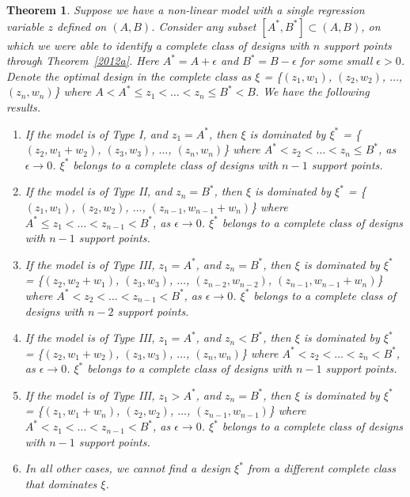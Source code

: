 \documentclass[11pt]{amsart}
\newtheorem{theorem}{Theorem}[section]
\theoremstyle{definition}
\theoremstyle{remark}
\numberwithin{equation}{section}
\begin{document}
\begin{theorem}\label{removepts}
 Suppose we have a non-linear model with a single regression variable $z$ defined on $(A,B)$. Consider any subset $[A^*,B^*]\subset (A,B)$, on which we were able to identify a complete class of designs with $n$ support points through Theorem~\ref{2012a}. Here $A^* = A+\epsilon$ and  $B^* = B-\epsilon$ for some small $\epsilon>0$. Denote the optimal design in the complete class as $\xi$ = \{$(z_1,w_1)$, $(z_2,w_2)$, $\ldots$, $(z_n,w_n)$\} where $A<A^*\le z_1< \ldots< z_n \le B^*<B$. We have the following results.\begin{enumerate}
     
     \item If the model is of Type I, and $z_1=A^*$, then $\xi$ is dominated by $\xi^*$ = \{$(z_2,w_1+w_2)$, $(z_3,w_3)$, $\ldots$, $(z_n,w_n)$\} where $A^* < z_2 <\ldots< z_n\le B^*$, as $\epsilon\to 0$.  $\xi^*$ belongs to a complete class of designs with $n-1$ support points.
     \item If the model is of Type II, and $z_n=B^*$, then $\xi$ is dominated by $\xi^*$ = \{$(z_1,w_1)$, $(z_2,w_2)$, $\ldots$, $(z_{n-1},w_{n-1}+w_n)$\} where $A^*\le z_1 <\ldots< z_{n-1}< B^*$, as $\epsilon\to 0$.  $\xi^*$ belongs to a complete class of designs with $n-1$ support points.
     \item If the model is of Type III, $z_1 = A^*$, and $z_n=B^*$, then $\xi$ is dominated by $\xi^*$ = \{$(z_2,w_2+w_1)$, $(z_3,w_3)$, $\ldots$, $(z_{n-2},w_{n-2})$,  $(z_{n-1},w_{n-1}+w_n)$\} where $A^*< z_2 <\ldots< z_{n-1}< B^*$, as $\epsilon\to 0$.  $\xi^*$ belongs to a complete class of designs with $n-2$ support points.
     \item If the model is of Type III, $z_1 = A^*$, and $z_n<B^*$, then $\xi$ is dominated by $\xi^*$ = \{$(z_2,w_1+w_2)$, $(z_3,w_3)$, $\ldots$, $(z_n,w_n)$\} where $A^* < z_2 <\ldots< z_n< B^*$, as $\epsilon\to 0$.  $\xi^*$ belongs to a complete class of designs with $n-1$ support points.
     \item If the model is of Type III, $z_1 > A^*$, and $z_n = B^*$, then $\xi$ is dominated by $\xi^*$ = \{$(z_1,w_1+w_n)$, $(z_2,w_2)$, $\ldots$, $(z_{n-1},w_{n-1})$\} where $A^*< z_1 <\ldots< z_{n-1}< B^*$, as $\epsilon\to 0$. $\xi^*$ belongs to a complete class of designs with $n-1$ support points.
     
     \item In all other cases, we cannot find a design $\xi^*$ from a different complete class that dominates $\xi$.
 \end{enumerate}
\end{theorem}
\end{document}
